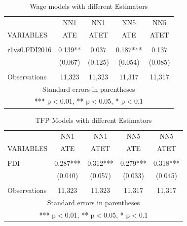 \documentclass[a4paper,12pt]{scrartcl}
\begin{document}
\begin{table}[htbp]\centering
\caption{Wage models with different Estimators}
\begin{tabular}{lcccc} \hline
 & NN1 & NN1 & NN5 & NN5 \\
VARIABLES & ATE & ATET & ATE & ATET\\ \hline
 &  &  &  &  \\
r1vs0.FDI2016 & 0.139** & 0.037 & 0.187*** & 0.137 \\
 & (0.067) & (0.125) & (0.054) & (0.085) \\
 &  &  &  &  \\
 Observations & 11,323 & 11,323 & 11,317 & 11,317 \\ \hline
\multicolumn{5}{c}{ Standard errors in parentheses} \\
\multicolumn{5}{c}{ *** p$<$0.01, ** p$<$0.05, * p$<$0.1} \\
\end{tabular}
\end{table}

\begin{table}[htbp]\centering
\caption{TFP Models with different Estimators}
\begin{tabular}{lcccc} \hline
 & NN1 & NN1 & NN5 & NN5 \\
VARIABLES & ATE & ATET & ATE & ATET \\ \hline
 &  &  &  &  \\
FDI & 0.287*** & 0.312*** & 0.279*** & 0.318*** \\
 & (0.040) & (0.057) & (0.033) & (0.045) \\
 &  &  &  &  \\
 Observations & 11,323 & 11,323 & 11,317 & 11,317 \\ \hline
\multicolumn{5}{c}{ Standard errors in parentheses} \\
\multicolumn{5}{c}{ *** p$<$0.01, ** p$<$0.05, * p$<$0.1} \\
\end{tabular}
\end{table}
\end{document}
